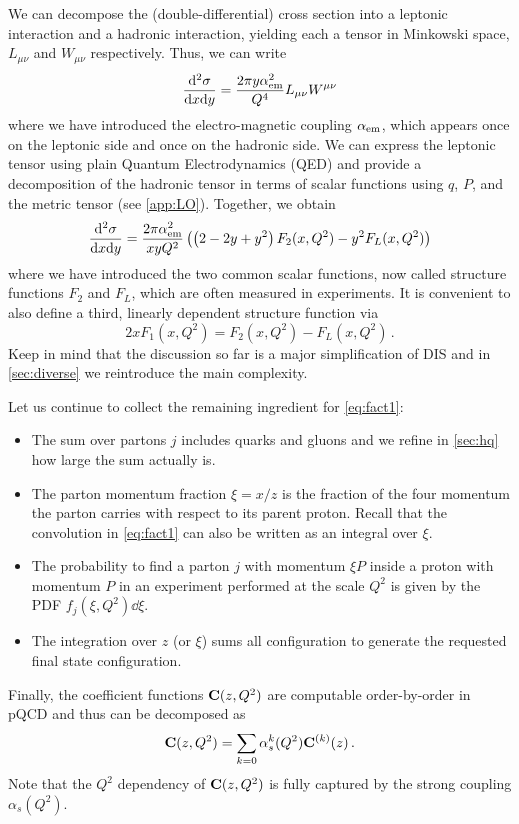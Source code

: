 We can decompose the (double-differential) cross section into a leptonic interaction and a hadronic interaction, yielding each a tensor in Minkowski space, $L_{\mu\nu}$ and $W_{\mu\nu}$ respectively.
Thus, we can write
\begin{equation}
    \frac{\dd[2] \sigma}{\dd x \dd y} = \frac{2\pi y \alpha_\text{em}^2}{Q^4} L_{\mu\nu}W^{\mu\nu}
\end{equation}
where we have introduced the electro-magnetic coupling $\alpha_\text{em}$, which appears once on the leptonic side and once on the hadronic side.
We can express the leptonic tensor using plain Quantum Electrodynamics (QED) and provide a decomposition of the hadronic tensor in terms of scalar functions using $q$, $P$, and the metric tensor (see \cref{app:LO}).
Together, we obtain
\begin{equation}
    \frac{\dd[2] \sigma}{\dd x \dd y} = \frac{2\pi \alpha_\text{em}^2}{xy Q^2} \left(\left(2 - 2y + y^2\right)F_2(x,Q^2) - y^2 F_L(x,Q^2)\right) \label{eq:dsigmadxdy}
\end{equation}
where we have introduced the two common scalar functions, now called structure functions $F_2$ and $F_L$, which are often measured in experiments.
It is convenient to also define a third, linearly dependent structure function via
\begin{equation}
    2xF_1 (x,Q^2) = F_2(x,Q^2) - F_L(x,Q^2)\,.
\end{equation}
Keep in mind that the discussion so far is a major simplification of DIS and in \cref{sec:diverse} we reintroduce the main complexity.

Let us continue to collect the remaining ingredient for \cref{eq:fact1}:
\begin{itemize}
    \item The sum over partons $j$ includes quarks and gluons and we refine in \cref{sec:hq} how large the sum actually is.
    \item The parton momentum fraction $\xi = x/z$ is the fraction of the four momentum the parton carries with respect to its parent proton.
        Recall that the convolution in \cref{eq:fact1} can also be written as an integral over $\xi$.
    \item The probability to find a parton $j$ with momentum $\xi P$ inside a proton with momentum $P$ in an experiment performed at the scale $Q^2$ is given by the PDF $f_j(\xi,Q^2)\dd \xi$.
    \item The integration over $z$ (or $\xi$) sums all configuration to generate the requested final state configuration.
\end{itemize}
Finally, the coefficient functions $\vb C(z,Q^2)$ are computable order-by-order in pQCD and thus can be decomposed as
\begin{equation}
    \vb C(z,Q^2) = \sum_{k=0} \alpha_s^k(Q^2) \vb C^{(k)}(z)\,. \label{eq:CpQCD}
\end{equation}
Note that the $Q^2$ dependency of $\vb C(z,Q^2)$ is fully captured by the strong coupling $\alpha_s(Q^2)$.

